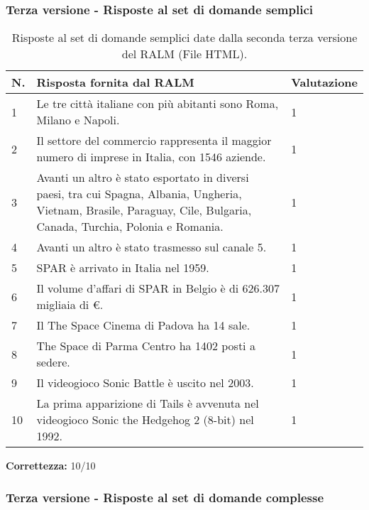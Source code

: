 \subsubsection{Terza versione - Risposte al set di domande semplici}

\begin{table}[H]
    \centering
    \begin{tabular}{|p{0.5cm} |p{6cm} |p{2cm}|}
        \hline
        \textbf{N}. & \textbf{Risposta fornita dal RALM} & \textbf{Valutazione} \\
        \hline
        1 & Le tre città italiane con più abitanti sono Roma, Milano e Napoli. & 1 \\
        \hline
        2 & Il settore del commercio rappresenta il maggior numero di imprese in Italia, con 1546 aziende. & 1 \\
        \hline
        3 & Avanti un altro è stato esportato in diversi paesi, tra cui Spagna, Albania, Ungheria, Vietnam, Brasile, Paraguay, Cile, Bulgaria, Canada, Turchia, Polonia e Romania. & 1 \\
        \hline
        4 & Avanti un altro è stato trasmesso sul canale 5. & 1 \\
        \hline
        5 & SPAR è arrivato in Italia nel 1959. & 1 \\
        \hline
        6 & Il volume d'affari di SPAR in Belgio è di 626.307 migliaia di €. & 1 \\
        \hline
        7 & Il The Space Cinema di Padova ha 14 sale. & 1 \\
        \hline
        8 & The Space di Parma Centro ha 1402 posti a sedere. & 1 \\
        \hline
        9 & Il videogioco Sonic Battle è uscito nel 2003. & 1 \\
        \hline
        10 & La prima apparizione di Tails è avvenuta nel videogioco Sonic the Hedgehog 2 (8-bit) nel 1992. & 1 \\
        \hline
    \end{tabular}
    \caption{Risposte al set di domande semplici date dalla seconda terza versione del RALM (File HTML).}
\end{table}

\textbf{Correttezza:} 10/10

\subsubsection{Terza versione - Risposte al set di domande complesse}

